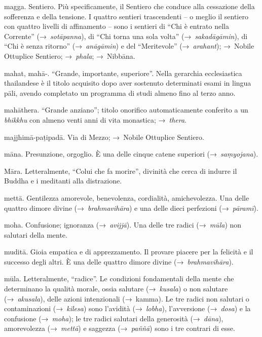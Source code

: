 \begin{glossarydescription}

\item[magga.] Sentiero. Più specificamente, il Sentiero che conduce alla
  cessazione della sofferenza e della tensione. I quattro sentieri trascendenti
  -- o meglio il sentiero con quattro livelli di affinamento -- sono i sentieri
  di ``Chi è entrato nella Corrente'' (→~\emph{sotāpanna}), di ``Chi torna una
  sola volta'' (→~\emph{sakadāgāmin}), di ``Chi è senza ritorno''
  (→~\emph{anāgāmin}) e del ``Meritevole'' (→~\emph{arahant}); →~Nobile Ottuplice
  Sentiero; →~\emph{phala}; →~Nibbāna.

\item[mahat, mahā-.] ``Grande, importante, superiore''. Nella gerarchia
  ecclesiastica thailandese è il titolo acquisito dopo aver sostenuto
  determinati esami in lingua pāli, avendo completato un programma di studi
  almeno fino al terzo anno.

\item[mahāthera.] ``Grande anziano''; titolo onorifico automaticamente
  conferito a un \emph{bhikkhu} con almeno venti anni di vita monastica;
  →~\emph{thera}.

\item[majjhimā-paṭipadā.] Via di Mezzo; →~Nobile Ottuplice Sentiero.

\item[māna.] Presunzione, orgoglio. È una delle cinque catene superiori
  (→~\emph{saṃyojana}).

\item[Māra.] Letteralmente, ``Colui che fa morire'', divinità che cerca di
  indurre il Buddha e i meditanti alla distrazione.

\item[mettā.] Gentilezza amorevole, benevolenza, cordialità,
  amichevolezza. Una delle quattro dimore divine (→~\emph{brahmavihāra}) e una
  delle dieci perfezioni (→~\emph{pāramī}).

\item[moha.] Confusione; ignoranza (→~\emph{avijjā}). Una delle tre radici
  (→~\emph{mūla}) non salutari della mente.

\item[muditā.] Gioia empatica e di apprezzamento. Il provare piacere per
  la felicità e il successo degli altri. È una delle quattro dimore divine
  (→~\emph{brahmavihāra}).

\item[mūla.] Letteralmente, ``radice''. Le condizioni fondamentali della
  mente che determinano la qualità morale, ossia salutare (→~\emph{kusala}) o
  non salutare (→~\emph{akusala}), delle azioni intenzionali (→~kamma).
  Le tre radici non salutari o contaminazioni (→~\emph{kilesa}) sono l'avidità
  (→~\emph{lobha}), l'avversione (→~\emph{dosa}) e la confusione
  (→~\emph{moha}); le tre radici salutari della generosità (→~\emph{dāna}),
  amorevolezza (→~\emph{mettā}) e saggezza (→~\emph{paññā}) sono i tre contrari
  di esse.


\end{glossarydescription}
